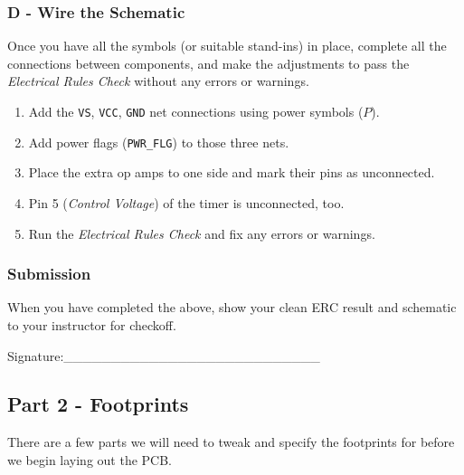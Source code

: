 \documentclass[
  letterpaper,
  DIV=11,
  numbers=noendperiod,
  oneside]{scrartcl}
\begin{document}
\newpage{}

\subsubsection{D - Wire the Schematic}\label{d---wire-the-schematic}

Once you have all the symbols (or suitable stand-ins) in place, complete
all the connections between components, and make the adjustments to pass
the \emph{Electrical Rules Check} without any errors or warnings.

\begin{enumerate}
\def\labelenumi{\arabic{enumi}.}
\item
  Add the \texttt{VS}, \texttt{VCC}, \texttt{GND} net connections using
  power symbols (\(P\)).
\item
  Add power flags (\texttt{PWR\_FLG}) to those three nets.
\item
  Place the extra op amps to one side and mark their pins as
  unconnected.
\item
  Pin 5 (\emph{Control Voltage}) of the timer is unconnected, too.
\item
  Run the \emph{Electrical Rules Check} and fix any errors or warnings.
\end{enumerate}

\subsubsection{Submission}\label{submission}

When you have completed the above, show your clean ERC result and
schematic to your instructor for checkoff.

\vspace{4em}

Signature:\_\_\_\_\_\_\_\_\_\_\_\_\_\_\_\_\_\_\_\_\_\_\_\_\_\_\_

\newpage{}

\subsection{Part 2 - Footprints}\label{part-2---footprints}

There are a few parts we will need to tweak and specify the footprints
for before we begin laying out the PCB.
\end{document}
